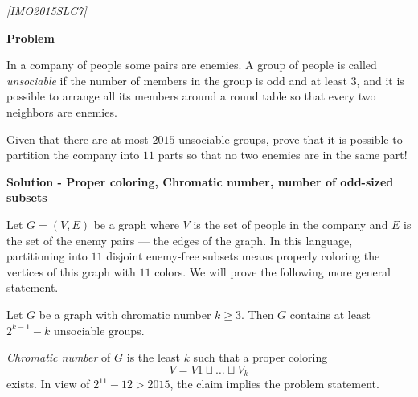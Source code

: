 \begin{problem}
\textit{[IMO2015SLC7]}

\textbf{Problem}


In a company of people some pairs are enemies. A group of people is called \textit{unsociable} if the number of members in the group is odd and at least $3$, and it is possible to arrange all its members around a round table so that every two neighbors are enemies. 

Given that there are at most $2015$ unsociable groups, prove that it is possible to partition the company into $11$ parts so that no two enemies are in the same part!

\textbf{Solution - Proper coloring, Chromatic number, number of odd-sized subsets}

Let $G = (V, E)$ be a graph where $V$ is the set of people in the company and $E$ is the set of the enemy pairs — the edges of the graph. In this language, partitioning into $11$ disjoint enemy-free subsets means properly coloring the vertices of this graph with $11$ colors. We will prove the following more general statement.

\begin{claim} Let $G$ be a graph with chromatic number $k \geq  3$. Then $G$ contains at least $2^{k-1} - k$ unsociable groups.
\end{claim}

\textit{Chromatic number} of $G$ is the least $k$ such that a proper coloring 
\begin{equation}
\label{propcoloring}
V = V1 \sqcup \dots \sqcup V_k
\end{equation}
exists. In view of $2^{11} - 12 > 2015$, the claim implies the problem statement. 


\end{problem}
